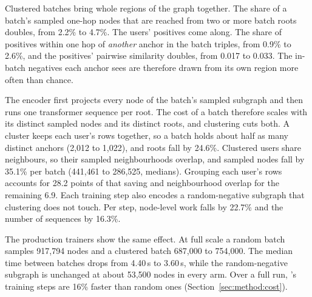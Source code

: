 Clustered batches bring whole regions of the graph together. The share of a batch's sampled one-hop nodes that are
reached from two or more batch roots doubles, from 2.2\% to 4.7\%. The users' positives come along. The share of
positives within one hop of \emph{another} anchor in the batch triples, from 0.9\% to 2.6\%, and the positives'
pairwise similarity doubles, from 0.017 to 0.033. The in-batch negatives each anchor sees are therefore drawn from its
own region more often than chance.

 The encoder first projects every node of the batch's sampled subgraph
and then runs one transformer sequence per root. The cost of a batch therefore scales with its distinct sampled nodes
and its distinct roots, and clustering cuts both. A cluster keeps each user's rows together, so a batch holds about
half as many distinct anchors (2{,}012 to 1{,}022), and roots fall by 24.6\%. Clustered users share neighbours, so
their sampled neighbourhoods overlap, and sampled nodes fall by 35.1\% per batch (441{,}461 to 286{,}525, medians).
Grouping each user's rows accounts for 28.2 points of that saving and neighbourhood overlap for the remaining 6.9. Each
training step also encodes a random-negative subgraph that clustering does not touch. Per step, node-level work falls
by 22.7\% and the number of sequences by 16.3\%.
\label{sec:locality:cost}

The production trainers show the same effect. At full scale a random batch samples 917{,}794 nodes and a clustered
batch 687{,}000 to 754{,}000. The median time between batches drops from 4.40\,s to 3.60\,s, while the random-negative
subgraph is unchanged at about 53{,}500 nodes in every arm. Over a full run, \ours{}'s training steps are 16\%
faster than random ones (Section~\ref{sec:method:cost}).
